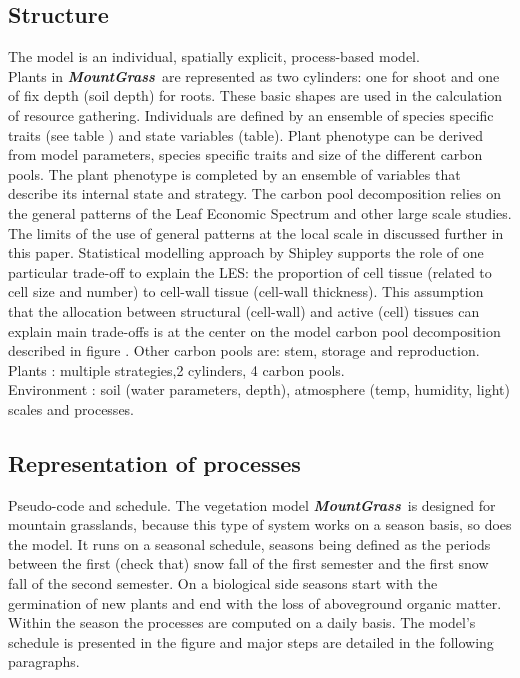 \documentclass[review]{elsarticle}
\newcommand{\model}{\textbf{\textit{MountGrass}}~}
\begin{document}
\subsection{Structure}
The model is an individual, spatially explicit, process-based model.\\
Plants in \model are represented as two cylinders: one for shoot and one of fix depth (soil depth) for roots. These basic shapes are used in the calculation of resource gathering. Individuals are defined by an ensemble of species specific traits (see table ) and state variables (table). Plant phenotype can be derived from model parameters, species specific traits and size of the different carbon pools. The plant phenotype is completed by an ensemble of variables that describe its internal state and strategy. The carbon pool decomposition relies on the general patterns of the Leaf Economic Spectrum and other large scale studies. The limits of the use of general patterns at the local scale in discussed further in this paper. Statistical modelling approach by Shipley supports the role of one particular trade-off to explain the LES: the proportion of cell tissue (related to cell size and number) to cell-wall tissue (cell-wall thickness). This assumption that the allocation between structural (cell-wall) and active (cell) tissues can explain main trade-offs is at the center on the model carbon pool decomposition described in figure . Other carbon pools are: stem, storage and reproduction. %
Plants : multiple strategies,2 cylinders, 4 carbon pools.\\
Environment : soil (water parameters, depth), atmosphere (temp, humidity, light)\\
scales and processes.

\subsection{Representation of processes}

Pseudo-code and schedule.
The vegetation model \model is designed for mountain grasslands, because this type of system works on a season basis, so does the model. It runs on a seasonal schedule, seasons being defined as the periods between the first (check that) snow fall of the first semester and the first snow fall of the second semester. On a biological side seasons start with the germination of new plants and end with the loss of aboveground organic matter. Within the season the processes are computed on a daily basis. The model's schedule is presented in the figure and major steps are detailed in the following paragraphs.\\
\end{document}
